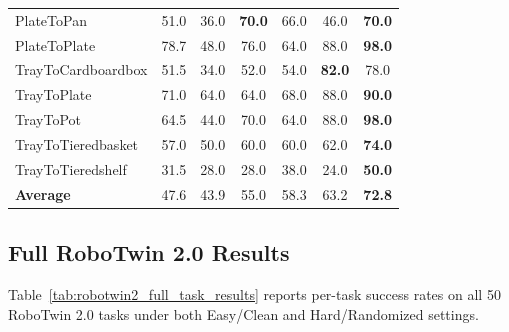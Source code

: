 \begin{table}[tp]
\begin{tabular*}{\textwidth}{@{\extracolsep{\fill}}lcccccc}
PlateToPan                 & 51.0 & 36.0 & \textbf{70.0} & 66.0 & 46.0 & \textbf{70.0} \\
PlateToPlate               & 78.7 & 48.0 & 76.0 & 64.0 & 88.0 & \textbf{98.0} \\
\hline
TrayToCardboardbox         & 51.5 & 34.0 & 52.0 & 54.0 & \textbf{82.0} & 78.0 \\
TrayToPlate                & 71.0 & 64.0 & 64.0 & 68.0 & 88.0 & \textbf{90.0} \\
TrayToPot                  & 64.5 & 44.0 & 70.0 & 64.0 & 88.0 & \textbf{98.0} \\
TrayToTieredbasket         & 57.0 & 50.0 & 60.0 & 60.0 & 62.0 & \textbf{74.0} \\
TrayToTieredshelf          & 31.5 & 28.0 & 28.0 & 38.0 & 24.0 & \textbf{50.0} \\
\hline
\textbf{Average}           & 47.6 & 43.9 & 55.0 & 58.3 & 63.2 & \textbf{72.8} \\
\hline
\end{tabular*}
\end{table}

\subsection{Full RoboTwin 2.0 Results}
\label{app:full-robotwin-results}

Table~\ref{tab:robotwin2_full_task_results} reports per-task success rates on all 50 RoboTwin 2.0
tasks under both Easy/Clean and Hard/Randomized settings.

